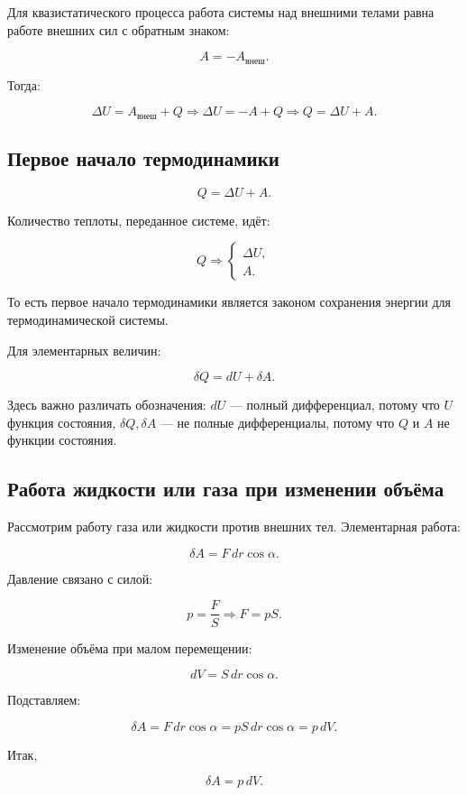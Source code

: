 \documentclass[a4paper,12pt]{article}
\begin{document}
Для квазистатического процесса работа системы над внешними телами равна работе внешних сил с обратным знаком:

\[
A=-A_{\text{внеш}}.
\]

Тогда:

\[
\Delta U=A_{\text{внеш}}+Q\Rightarrow \Delta U=-A+Q\Rightarrow Q=\Delta U+A.
\]

\subsection*{Первое начало термодинамики}

\begin{theorembox}
\[
Q=\Delta U+A.
\]
\end{theorembox}

Количество теплоты, переданное системе, идёт:

\[
Q\Rightarrow
\begin{cases}
\Delta U,\\
A.
\end{cases}
\]

То есть первое начало термодинамики является законом сохранения энергии для термодинамической системы.

Для элементарных величин:

\[
\delta Q=dU+\delta A.
\]

Здесь важно различать обозначения: $dU$ — полный дифференциал, потому что $U$ функция состояния, $\delta Q,\delta A$ — не полные дифференциалы, потому что $Q$ и $A$ не функции состояния.

\subsection*{Работа жидкости или газа при изменении объёма}

Рассмотрим работу газа или жидкости против внешних тел. Элементарная работа:

\[
\delta A=F\,dr\cos\alpha.
\]

Давление связано с силой:

\[
p=\frac{F}{S}\Rightarrow F=pS.
\]

Изменение объёма при малом перемещении:

\[
dV=S\,dr\cos\alpha.
\]

Подставляем:

\[
\delta A=F\,dr\cos\alpha=pS\,dr\cos\alpha=p\,dV.
\]

Итак,

\[
\delta A=p\,dV.
\]
\end{document}
